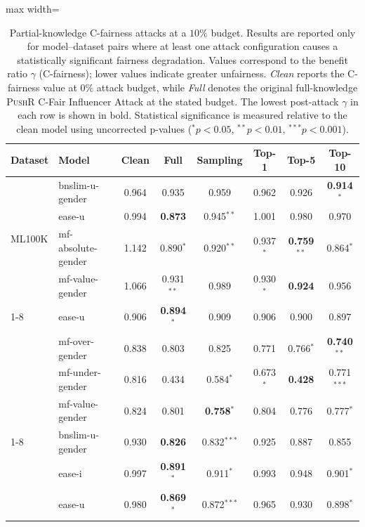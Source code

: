 \begin{table}
\centering
\caption[C-fairness effects of partial-knowledge attacks at a $10\%$ budget]{Partial-knowledge C-fairness attacks at a $10\%$ budget.
Results are reported only for model--dataset pairs where at least one attack configuration causes a statistically significant fairness degradation.
Values correspond to the benefit ratio $\gamma$ (C-fairness); lower values indicate greater unfairness.
\textit{Clean} reports the C-fairness value at $0\%$ attack budget, while \textit{Full} denotes the original full-knowledge \textsc{PushR} C-Fair Influencer Attack at the stated budget.
The lowest post-attack $\gamma$ in each row is shown in bold.
Statistical significance is measured relative to the clean model using uncorrected p-values ($^{*}p<0.05$, $^{**}p<0.01$, $^{***}p<0.001$).}
\label{tab:partial_knowledge_attacks}
\footnotesize
\begin{adjustbox}{max width=\textwidth}
\begin{tabular}{llcccccc}
\toprule
Dataset & Model & Clean & Full & Sampling & Top-1 & Top-5 & Top-10 \\
\midrule
\multirow{4}{*}{ML100K} & bnslim-u-gender & 0.964 & 0.935 & 0.959 & 0.962 & 0.926 & \textbf{0.914}$^{*}$ \\
 & ease-u & 0.994 & \textbf{0.873} & 0.945$^{**}$ & 1.001 & 0.980 & 0.970 \\
 & mf-absolute-gender & 1.142 & 0.890$^{*}$ & 0.920$^{**}$ & 0.937$^{*}$ & \textbf{0.759}$^{**}$ & 0.864$^{*}$ \\
 & mf-value-gender & 1.066 & 0.931$^{**}$ & 0.989 & 0.930$^{*}$ & \textbf{0.924} & 0.956 \\
\cmidrule(lr){1-8}
\multirow{4}{*}{ML1M} & ease-u & 0.906 & \textbf{0.894}$^{*}$ & 0.909 & 0.906 & 0.900 & 0.897 \\
 & mf-over-gender & 0.838 & 0.803 & 0.825 & 0.771 & 0.766$^{*}$ & \textbf{0.740}$^{**}$ \\
 & mf-under-gender & 0.816 & 0.434 & 0.584$^{*}$ & 0.673$^{*}$ & \textbf{0.428} & 0.771$^{***}$ \\
 & mf-value-gender & 0.824 & 0.801 & \textbf{0.758}$^{*}$ & 0.804 & 0.776 & 0.777$^{*}$ \\
\cmidrule(lr){1-8}
\multirow{9}{*}{LFM1K} & bnslim-u-gender & 0.930 & \textbf{0.826} & 0.832$^{***}$ & 0.925 & 0.887 & 0.855 \\
 & ease-i & 0.997 & \textbf{0.891}$^{*}$ & 0.911$^{*}$ & 0.993 & 0.948 & 0.901$^{*}$ \\
 & ease-u & 0.980 & \textbf{0.869}$^{*}$ & 0.872$^{***}$ & 0.965 & 0.930 & 0.898$^{*}$ \\

\end{tabular}
\end{adjustbox}
\end{table}
